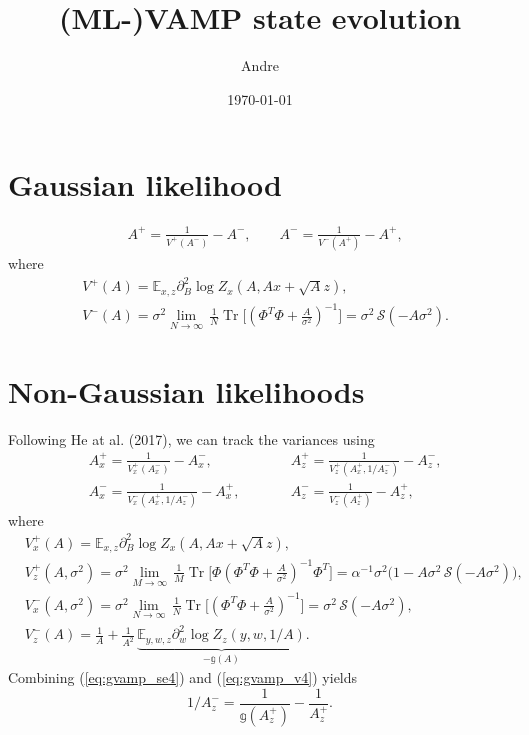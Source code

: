 \documentclass{article}
\title{(ML-)VAMP state evolution}
\author{Andre}
\date{\today}
\begin{document}
\maketitle

\section{Gaussian likelihood}

\begin{align}
    &A^+ = \frac{1}{V^+ (A^-)} - A^-, \qquad
    A^- = \frac{1}{V^- (A^+)} - A^+,
\end{align}
where
\begin{align}
    &V^+ (A) = \mathbb{E}_{x, z} \partial_B^2 \log Z_x (A, Ax + \sqrt{A}z), \\
    &V^- (A) = \sigma^2 \lim_{N \to \infty} \, \frac{1}{N} \operatorname{Tr}
    \big[ (\Phi^T \Phi + \frac{A}{\sigma^2})^{-1} \big] = \sigma^2 \, \mathcal{S}
    (-A \sigma^2).
\end{align}

\section{Non-Gaussian likelihoods}

Following He at al. (2017), we can track the variances using
\begin{align}
    &A^+_x = \frac{1}{V^+_x (A^-_x)} - A^-_x, &&\qquad
    A^+_z = \frac{1}{V^+_z (A^+_x, 1 / A_z^-)} - A^-_z, \\
    &A^-_x = \frac{1}{V^-_x (A^+_x, 1 / A_z^-)} - A^+_x, &&\qquad
    A^-_z = \frac{1}{V^-_z (A^+_z)} - A^+_z, \label{eq:gvamp_se4}
\end{align}
where
\begin{align}
    &V^+_x (A) = \mathbb{E}_{x, z} \partial_B^2 \log Z_x (A, Ax + \sqrt{A}z), \\
    &V^+_z (A, \sigma^2) = \sigma^2 \lim_{M \to \infty} \, \frac{1}{M} \operatorname{Tr}
    \big[ \Phi (\Phi^T \Phi + \frac{A}{\sigma^2})^{-1} \Phi^T \big] = \alpha^{-1} \sigma^2 \big(1 - A \sigma^2 \, \mathcal{S}
    (-A \sigma^2)\big), \\
    &V^-_x (A, \sigma^2) = \sigma^2 \lim_{N \to \infty} \, \frac{1}{N} \operatorname{Tr}
    \big[ (\Phi^T \Phi + \frac{A}{\sigma^2})^{-1} \big] = \sigma^2 \, \mathcal{S}
    (-A \sigma^2), \\
    &V^-_z (A) = \frac{1}{A} + \frac{1}{A^2} \, \underbrace{\mathbb{E}_{y,
        w, z} \partial_w^2 \log Z_z (y, w, 1 / A)}_{-\mathbb{g} (A)}.
        \label{eq:gvamp_v4}
\end{align}
Combining (\ref{eq:gvamp_se4}) and (\ref{eq:gvamp_v4}) yields
\begin{equation}
    1 / A_z^- = \frac{1}{\mathbb{g} (A_z^+)} - \frac{1}{A_z^+}.
\end{equation}
\end{document}
